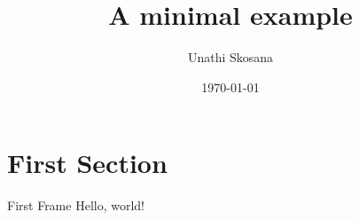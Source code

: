 \documentclass[10pt]{beamer}
\title{A minimal example}
\date{\today}
\author{Unathi Skosana}
\institute{Stellenbosch University}
\begin{document}
    \maketitle

    \section{First Section}

    \begin{frame}{First Frame}
      Hello, world!
    \end{frame}
  
\end{document}

